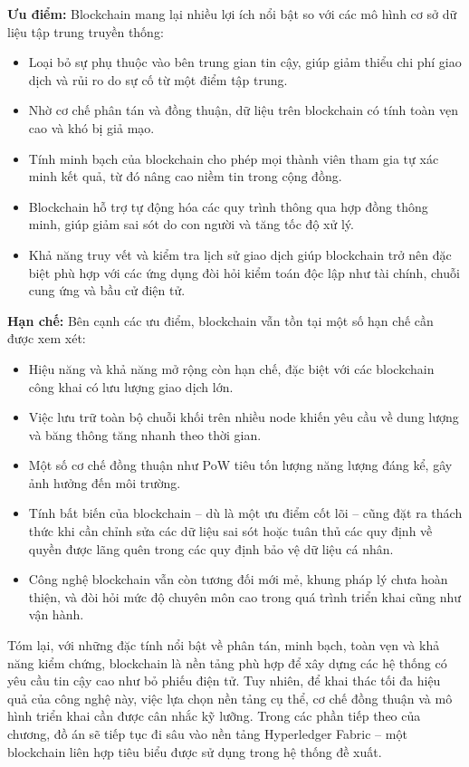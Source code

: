 \textbf{Ưu điểm:} Blockchain mang lại nhiều lợi ích nổi bật so với các mô hình cơ sở dữ liệu tập trung truyền thống:
\begin{itemize}
    \item Loại bỏ sự phụ thuộc vào bên trung gian tin cậy, giúp giảm thiểu chi phí giao dịch và rủi ro do sự cố từ một điểm tập trung.

    \item Nhờ cơ chế phân tán và đồng thuận, dữ liệu trên blockchain có tính toàn vẹn cao và khó bị giả mạo.

    \item Tính minh bạch của blockchain cho phép mọi thành viên tham gia tự xác minh kết quả, từ đó nâng cao niềm tin trong cộng đồng.

    \item Blockchain hỗ trợ tự động hóa các quy trình thông qua hợp đồng thông minh, giúp giảm sai sót do con người và tăng tốc độ xử lý.

    \item Khả năng truy vết và kiểm tra lịch sử giao dịch giúp blockchain trở nên đặc biệt phù hợp với các ứng dụng đòi hỏi kiểm toán độc lập như tài chính, chuỗi cung ứng và bầu cử điện tử.
\end{itemize}

\textbf{Hạn chế:} Bên cạnh các ưu điểm, blockchain vẫn tồn tại một số hạn chế cần được xem xét:
\begin{itemize}
    \item Hiệu năng và khả năng mở rộng còn hạn chế, đặc biệt với các blockchain công khai có lưu lượng giao dịch lớn.

    \item Việc lưu trữ toàn bộ chuỗi khối trên nhiều node khiến yêu cầu về dung lượng và băng thông tăng nhanh theo thời gian.

    \item Một số cơ chế đồng thuận như PoW tiêu tốn lượng năng lượng đáng kể, gây ảnh hưởng đến môi trường.

    \item Tính bất biến của blockchain -- dù là một ưu điểm cốt lõi -- cũng đặt ra thách thức khi cần chỉnh sửa các dữ liệu sai sót hoặc tuân thủ các quy định về quyền được lãng quên trong các quy định bảo vệ dữ liệu cá nhân.

    \item Công nghệ blockchain vẫn còn tương đối mới mẻ, khung pháp lý chưa hoàn thiện, và đòi hỏi mức độ chuyên môn cao trong quá trình triển khai cũng như vận hành.
\end{itemize}

Tóm lại, với những đặc tính nổi bật về phân tán, minh bạch, toàn vẹn và khả năng kiểm chứng, blockchain là nền tảng phù hợp để xây dựng các hệ thống có yêu cầu tin cậy cao như bỏ phiếu điện tử. Tuy nhiên, để khai thác tối đa hiệu quả của công nghệ này, việc lựa chọn nền tảng cụ thể, cơ chế đồng thuận và mô hình triển khai cần được cân nhắc kỹ lưỡng. Trong các phần tiếp theo của chương, đồ án sẽ tiếp tục đi sâu vào nền tảng Hyperledger Fabric -- một blockchain liên hợp tiêu biểu được sử dụng trong hệ thống đề xuất.
